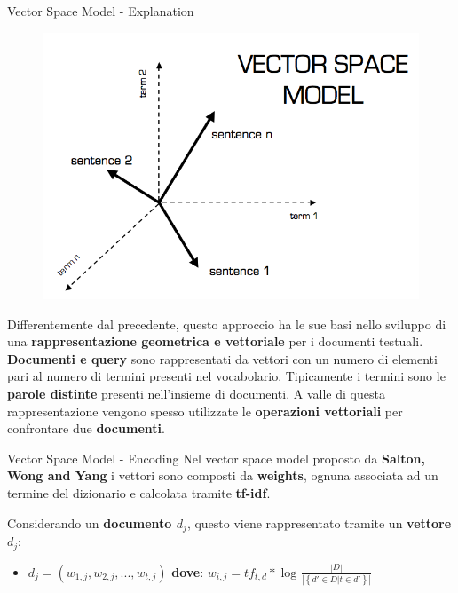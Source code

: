 \documentclass[british]{beamer}
\begin{document}
\begin{frame}{Vector Space Model - Explanation}
	\begin{figure}
		\includegraphics[width=1.1\linewidth,height=0.4\textwidth]{./Imgs/vector_space.png}
	\end{figure}	
	Differentemente dal precedente, questo approccio ha le sue basi nello sviluppo di una \textbf{rappresentazione geometrica e vettoriale} per i documenti testuali.
	\textbf{Documenti e query} sono rappresentati da vettori con un numero di elementi pari al numero di termini presenti nel vocabolario.
	Tipicamente i termini sono le \textbf{parole distinte} presenti nell'insieme di documenti.
	A valle di questa rappresentazione vengono spesso utilizzate le \textbf{operazioni vettoriali} per confrontare due \textbf{documenti}.
\end{frame}

\begin{frame}{Vector Space Model - Encoding}
	Nel vector space model proposto da \textbf{Salton, Wong and Yang} i vettori sono composti da \textbf{weights}, ognuna associata ad un termine del dizionario e calcolata tramite \textbf{tf-idf}.\par
	Considerando un \textbf{documento \(d_j\)}, questo viene rappresentato tramite un \textbf{vettore \(d_j\)}: \par
	\begin{itemize}
		\item \(d_j = (w_{1,j}, w_{2,j}, ..., w_{t,j})\) \textbf{dove}:
		\(w_{i,j} = tf_{t,d} * \log_{}{\frac{|D|}{|\left \{d' \in D | t \in d'\right \}|}}\)
	\end{itemize}
	
\end{frame}
\end{document}
